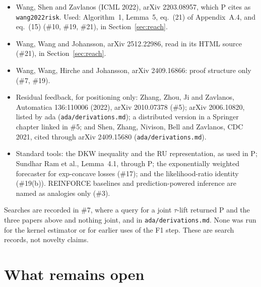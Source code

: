 \documentclass{article}
\begin{document}
\begin{itemize}
\item Wang, Shen and Zavlanos (ICML 2022), arXiv 2203.08957, which P
cites as \texttt{wang2022risk}. Used: Algorithm~1, Lemma~5, eq.~(21) of
Appendix~A.4, and eq.~(15) (\#10, \#19, \#21), in
Section~\ref{sec:reach}.
\item Wang, Wang and Johansson, arXiv 2512.22986, read in its HTML
source (\#21), in Section~\ref{sec:reach}.
\item Wang, Wang, Hirche and Johansson, arXiv 2409.16866: proof structure
only (\#7, \#19).
\item Residual feedback, for positioning only: Zhang, Zhou, Ji and
Zavlanos, Automatica 136:110006 (2022), arXiv 2010.07378 (\#5); arXiv
2006.10820, listed by ada (\texttt{ada/derivations.md}); a distributed
version in a Springer chapter linked in \#5; and Shen, Zhang, Nivison,
Bell and Zavlanos, CDC 2021, cited through arXiv 2409.15680
(\texttt{ada/derivations.md}).
\item Standard tools: the DKW inequality and the RU representation, as
used in P; Sundhar Ram et al., Lemma~4.1, through P; the exponentially
weighted forecaster for exp-concave losses (\#17); and the
likelihood-ratio identity (\#19(b)). REINFORCE baselines and
prediction-powered inference are named as analogies only (\#3).
\end{itemize}
Searches are recorded in \#7, where a query for a joint $\tau$-lift
returned P and the three papers above and nothing joint, and in
\texttt{ada/derivations.md}. None was run for the kernel estimator or for
earlier uses of the F1 step. These are search records, not novelty
claims.

\section{What remains open}
\end{document}
